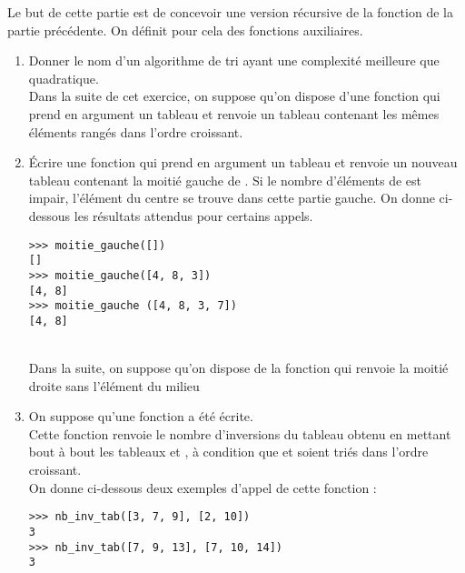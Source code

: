 \documentclass[a4paper,12pt,french]{book}
\begin{document}
Le but de cette partie est de concevoir une version récursive de la fonction de la partie précédente.
On définit pour cela des fonctions auxiliaires.

\begin{enumerate}[\bfseries 1.]
	\item 	Donner le nom d’un algorithme de tri ayant une complexité meilleure que quadratique.\\

Dans la suite de cet exercice, on suppose qu’on dispose d'une fonction  qui prend en
argument un tableau et renvoie un tableau contenant les mêmes éléments rangés dans l'ordre
croissant.

	\item Écrire une fonction  qui prend en argument un tableau  et
    renvoie un nouveau tableau contenant la moitié gauche de . Si le nombre d'éléments
    de  est impair, l'élément du centre se trouve dans cette partie gauche.
    On donne ci-dessous les résultats attendus pour certains appels.
\begin{verbatim}
>>> moitie_gauche([])
[]
>>> moitie_gauche([4, 8, 3])
[4, 8]
>>> moitie_gauche ([4, 8, 3, 7])
[4, 8]
\end{verbatim}
\ \\
Dans la suite, on suppose qu’on dispose de la fonction  qui renvoie la
moitié droite sans l’élément du milieu

\item On suppose qu’une fonction  a été écrite.\\
Cette fonction renvoie le nombre d’inversions du tableau obtenu en mettant bout à bout les tableaux
 et , à condition que  et  soient triés dans l’ordre croissant.\\
On donne ci-dessous deux exemples d’appel de cette fonction :
\begin{verbatim}
>>> nb_inv_tab([3, 7, 9], [2, 10])
3
>>> nb_inv_tab([7, 9, 13], [7, 10, 14])
3
\end{verbatim}


\end{enumerate}
\end{document}
